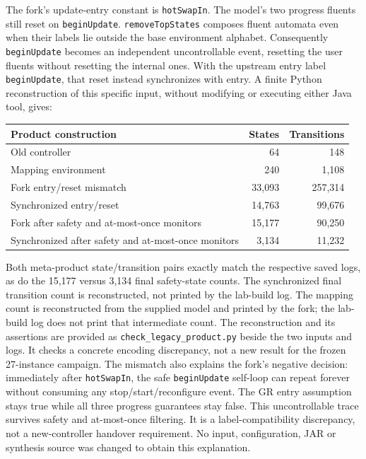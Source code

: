 \documentclass[11pt]{article}
\begin{document}
The fork's update-entry constant is \texttt{hotSwapIn}. The model's two progress fluents still reset on \texttt{beginUpdate}. \texttt{removeTopStates} composes fluent automata even when their labels lie outside the base environment alphabet. Consequently \texttt{beginUpdate} becomes an independent uncontrollable event, resetting the user fluents without resetting the internal ones. With the upstream entry label \texttt{beginUpdate}, that reset instead synchronizes with entry. A finite Python reconstruction of this specific input, without modifying or executing either Java tool, gives:
\begin{center}\small
\begin{tabular}{@{}lrr@{}}
\toprule
Product construction & States & Transitions\\
\midrule
Old controller & 64 & 148\\
Mapping environment & 240 & 1,108\\
Fork entry/reset mismatch & 33,093 & 257,314\\
Synchronized entry/reset & 14,763 & 99,676\\
Fork after safety and at-most-once monitors & 15,177 & 90,250\\
Synchronized after safety and at-most-once monitors & 3,134 & 11,232\\
\bottomrule
\end{tabular}
\end{center}
Both meta-product state/transition pairs exactly match the respective saved logs, as do the 15,177 versus 3,134 final safety-state counts. The synchronized final transition count is reconstructed, not printed by the lab-build log. The mapping count is reconstructed from the supplied model and printed by the fork; the lab-build log does not print that intermediate count. The reconstruction and its assertions are provided as \texttt{check\_legacy\_product.py} beside the two inputs and logs. It checks a concrete encoding discrepancy, not a new result for the frozen 27-instance campaign. The mismatch also explains the fork's negative decision: immediately after \texttt{hotSwapIn}, the safe \texttt{beginUpdate} self-loop can repeat forever without consuming any stop/start/reconfigure event. The GR entry assumption stays true while all three progress guarantees stay false. This uncontrollable trace survives safety and at-most-once filtering. It is a label-compatibility discrepancy, not a new-controller handover requirement. No input, configuration, JAR or synthesis source was changed to obtain this explanation.
\end{document}
